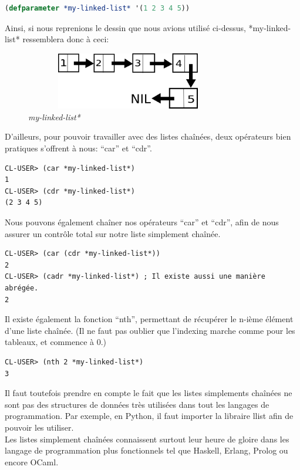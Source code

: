 \documentclass[a4paper, 12pt]{article}
\numberwithin{equation}{subsection}
\begin{document}
\begin{lstlisting}[language=Lisp]
(defparameter *my-linked-list* '(1 2 3 4 5))
\end{lstlisting}
Ainsi, si nous reprenions le dessin que nous avions utilisé ci-dessus,
*my-linked-list* ressemblera donc à ceci: \\
\begin{figure}[H]
  \centering
  \includegraphics[width=9.0cm, height=2.5cm]{imgs/my_linked_list.png}
  \caption{{\em *my-linked-list*}}
\end{figure}
D'ailleurs, pour pouvoir travailler avec des listes chaînées, deux opérateurs bien pratiques s'offrent à nous: ``car'' et ``cdr''. \\[0.2cm]
\begin{lstlisting}[language=LISP]
CL-USER> (car *my-linked-list*)
1
CL-USER> (cdr *my-linked-list*)
(2 3 4 5)
\end{lstlisting}
Nous pouvons également chaîner nos opérateurs ``car'' et ``cdr'', afin de nous assurer un contrôle total sur notre liste simplement chaînée.
\begin{lstlisting}[language=LISP]
CL-USER> (car (cdr *my-linked-list*))
2
CL-USER> (cadr *my-linked-list*) ; Il existe aussi une manière abrégée.
2
\end{lstlisting}
Il existe également la fonction ``nth'', permettant de récupérer le n-ième élément d'une liste chaînée. (Il ne faut pas oublier que l'indexing marche comme pour les tableaux, et commence à 0.)
\begin{lstlisting}[language=LISP]
CL-USER> (nth 2 *my-linked-list*)
3
\end{lstlisting}
Il faut toutefois prendre en compte le fait que les listes simplements chaînées ne sont pas des structures de données très utilisées dans tout les langages de programmation. Par exemple, en Python, il faut importer la libraire llist afin de pouvoir les utiliser. \\

Les listes simplement chaînées connaissent surtout leur heure de gloire dans les langage de programmation plus fonctionnels tel que Haskell, Erlang, Prolog ou encore OCaml.
\end{document}
